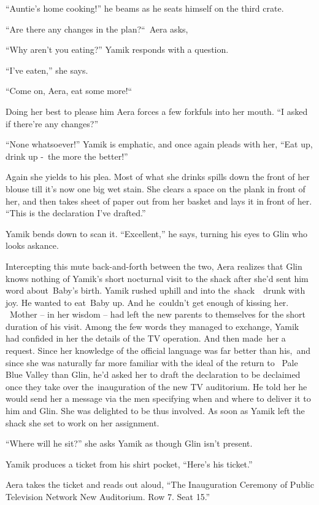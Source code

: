 \documentclass[twoside,11pt]{book}
\begin{document}
``Auntie's home cooking!'' he beams as he seats himself on the third crate. 

``Are there any changes in the plan?``~Aera asks,

``Why aren't you eating?'' Yamik responds with a question. 

``I've eaten,'' she says. ~

``Come on, Aera, eat some more!``\ \ 

Doing her best to please him Aera forces a few forkfuls into her mouth. ``I asked if there're any
changes?''

``None whatsoever!'' Yamik is emphatic, and once again pleads with her, ``Eat up, drink up
-{\ }the more the better!'' 

Again she yields to his plea. Most of what she drinks spills down the front of her blouse till it's now one big wet
stain. She clears a space on the plank in front of her, and then takes sheet of paper out from her basket and lays it
in front of her. ``This is the declaration I've drafted.''

Yamik bends down to scan it. ``Excellent,'' he says, turning his eyes to Glin who looks
askance.

Intercepting this mute back-and-forth between the two, Aera realizes that Glin knows nothing of Yamik's short nocturnal
visit to the shack after she'd sent him word about\ Baby's birth. Yamik rushed uphill and into the\ shack\ \ drunk with
joy. He wanted to eat\ Baby up. And he{\ }couldn't get enough of kissing her. ~Mother -- in her wisdom
-- had left the new parents to themselves for the short duration of his visit. Among the few words they managed to
exchange, Yamik had confided in her the details of the TV operation. And then made\ her a request. Since her knowledge
of the official language was far better than his,\ and since she was naturally far more familiar with the ideal of the
return to \ Pale Blue Valley than Glin, he'd asked her to draft the declaration to be declaimed once they take over
the\ inauguration of the new TV auditorium. He told her he would send her a message via the men specifying when and
where to deliver it to him and Glin. She was delighted to be thus involved. As soon as Yamik left the shack she set to
work on her assignment{. }

``Where will he sit?'' she asks Yamik as though Glin isn't present. 

Yamik produces a ticket from his shirt pocket, ``Here's his ticket.'' 

Aera takes the ticket and reads out aloud, ``The Inauguration Ceremony of Public Television Network New
Auditorium. Row 7. Seat 15.'' 
\end{document}
